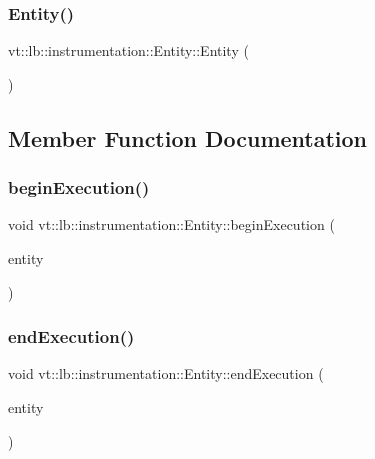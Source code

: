 \subsubsection{\texorpdfstring{Entity()}{Entity()}}
{\footnotesize\ttfamily vt\+::lb\+::instrumentation\+::\+Entity\+::\+Entity (\begin{DoxyParamCaption}{ }\end{DoxyParamCaption})\hspace{0.3cm}{\ttfamily [default]}}



\subsection{Member Function Documentation}
\mbox{\label{structvt_1_1lb_1_1instrumentation_1_1_entity_a89aef535e92de0f4a4034545c062fd56}} 
\subsubsection{\texorpdfstring{begin\+Execution()}{beginExecution()}}
{\footnotesize\ttfamily void vt\+::lb\+::instrumentation\+::\+Entity\+::begin\+Execution (\begin{DoxyParamCaption}\item[{\hyperlink{namespacevt_a92ec26fb6644cd0ba7eb0ee70c96bee5}{L\+B\+Entity\+Type} const \&}]{entity }\end{DoxyParamCaption})\hspace{0.3cm}{\ttfamily [static]}}

\mbox{\label{structvt_1_1lb_1_1instrumentation_1_1_entity_a9c5b561aa594e153ad2fa05f9f2c05d8}} 
\subsubsection{\texorpdfstring{end\+Execution()}{endExecution()}}
{\footnotesize\ttfamily void vt\+::lb\+::instrumentation\+::\+Entity\+::end\+Execution (\begin{DoxyParamCaption}\item[{\hyperlink{namespacevt_a92ec26fb6644cd0ba7eb0ee70c96bee5}{L\+B\+Entity\+Type} const \&}]{entity }\end{DoxyParamCaption})\hspace{0.3cm}{\ttfamily [static]}}

